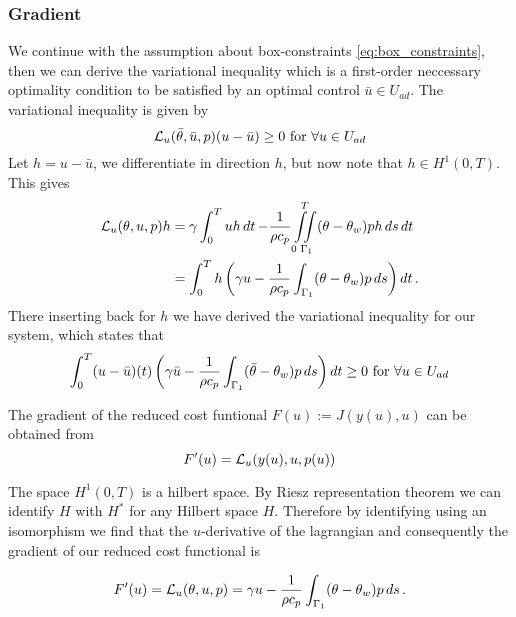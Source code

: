 \subsubsection{Gradient}
We continue with the assumption about box-constraints \eqref{eq:box_constraints}, then we can derive the variational inequality which is a first-order neccessary optimality condition to be satisfied by an optimal control $\bar{u} \in U_{ad}$. The variational inequality is given by 
\begin{equation*}
    \mathcal{L}_u(\bar{\theta},\bar{u},p)(u-\bar{u}) \geq 0 \text{ for } \forall u\in U_{ad}
\end{equation*}
Let $h = u - \bar{u}$, we differentiate in direction $h$, but now note that $h\in H^1(0, T)$. This gives
\begin{equation}
\begin{aligned} %
  \L_u(\theta, u, p) h &= \gamma\int_0^T uh \dt - \frac{1}{\rho c_p} \iint\limits_{0\,\,\Gamma_1}^{\,\,\,T}(\theta - \theta_w)ph \dsdt \\
  &= \int_0^T h \left( \gamma u - \frac{1}{\rho c_p} \int_{\Gamma_1}(\theta - \theta_w)p \mathop{ds} \right) \dt.
\end{aligned}
\end{equation}
There inserting back for $h$ we have derived the variational inequality for our system, which states that
\begin{equation}
    \label{eq:variational}
    \int_0^T (u - \bar{u})(t) \left( \gamma \bar{u} - \frac{1}{\rho c_p} \int_{\Gamma_1}(\bar{\theta} - \theta_w)p \mathop{ds} \right) \mathop{dt} \geq 0 \text{ for } \forall u \in U_{ad}
\end{equation}

The gradient of the reduced cost funtional $F(u) := J(y(u),u)$ can be obtained from 
\begin{equation*}
    F'(u) = \mathcal{L}_u(y(u),u,p(u))
\end{equation*}

The space $H^1(0,T)$ is a hilbert space. By Riesz representation theorem we can identify $H$ with $H^{*}$ for any Hilbert space $H$. Therefore by identifying using an isomorphism we find that the $u$-derivative of the lagrangian and consequently the gradient of our reduced cost functional is

\begin{equation*}
    F'(u) = \mathcal{L}_u(\theta,u,p) = \gamma u - \frac{1}{\rho c_p}\int_{\Gamma_1}(\theta - \theta_w)p \mathop{ds}.
\end{equation*}


